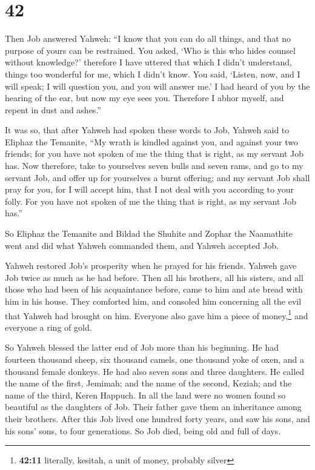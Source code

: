 \hypertarget{section-41}{%
\section{42}\label{section-41}}

 Then Job answered Yahweh:  ``I know that
you can do all things, and that no purpose of yours can be restrained.
 You asked, `Who is this who hides counsel without
knowledge?' therefore I have uttered that which I didn't understand,
things too wonderful for me, which I didn't know.  You
said, `Listen, now, and I will speak; I will question you, and you will
answer me.'  I had heard of you by the hearing of the ear,
but now my eye sees you.  Therefore I abhor myself, and
repent in dust and ashes.''

 It was so, that after Yahweh had spoken these words to
Job, Yahweh said to Eliphaz the Temanite, ``My wrath is kindled against
you, and against your two friends; for you have not spoken of me the
thing that is right, as my servant Job has.  Now
therefore, take to yourselves seven bulls and seven rams, and go to my
servant Job, and offer up for yourselves a burnt offering; and my
servant Job shall pray for you, for I will accept him, that I not deal
with you according to your folly. For you have not spoken of me the
thing that is right, as my servant Job has.''

 So Eliphaz the Temanite and Bildad the Shuhite and Zophar
the Naamathite went and did what Yahweh commanded them, and Yahweh
accepted Job.

 Yahweh restored Job's prosperity when he prayed for his
friends. Yahweh gave Job twice as much as he had before. 
Then all his brothers, all his sisters, and all those who had been of
his acquaintance before, came to him and ate bread with him in his
house. They comforted him, and consoled him concerning all the evil that
Yahweh had brought on him. Everyone also gave him a piece of
money,\footnote{\textbf{42:11} literally, kesitah, a unit of money,
  probably silver} and everyone a ring of gold.

 So Yahweh blessed the latter end of Job more than his
beginning. He had fourteen thousand sheep, six thousand camels, one
thousand yoke of oxen, and a thousand female donkeys.  He
had also seven sons and three daughters.  He called the
name of the first, Jemimah; and the name of the second, Keziah; and the
name of the third, Keren Happuch.  In all the land were
no women found so beautiful as the daughters of Job. Their father gave
them an inheritance among their brothers.  After this Job
lived one hundred forty years, and saw his sons, and his sons' sons, to
four generations.  So Job died, being old and full of
days.
